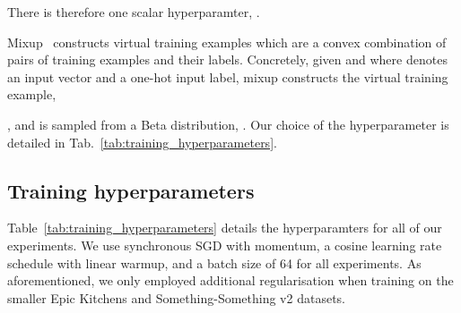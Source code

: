 \documentclass[10pt,twocolumn,letterpaper]{article}
\makeatletter
\renewcommand{\paragraph}{\@startsection{paragraph}{4}{\z@}{1.625ex \@plus 1ex \@minus .2ex}{-1em}{\normalfont\normalsize\bfseries}}
\makeatother
\begin{document}
There is therefore one scalar hyperparamter, .

\paragraph{Mixup}
Mixup~\cite{zhang_mixup_iclr_2018} constructs virtual training examples which are a convex combination of pairs of training examples and their labels.
Concretely, given  and  where  denotes an input vector and  a one-hot input label, mixup constructs the virtual training example,

, and is sampled from a Beta distribution, .
Our choice of the hyperparameter  is detailed in Tab.~\ref{tab:training_hyperparameters}.


\subsection{Training hyperparameters}
\label{sec:hyperparameters}

Table~\ref{tab:training_hyperparameters} details the hyperparamters for all of our experiments.
We use synchronous SGD with momentum, a cosine learning rate schedule with linear warmup, and a batch size of 64 for all experiments.
As aforementioned, we only employed additional regularisation when training on the smaller Epic Kitchens and Something-Something v2 datasets. 
\end{document}
